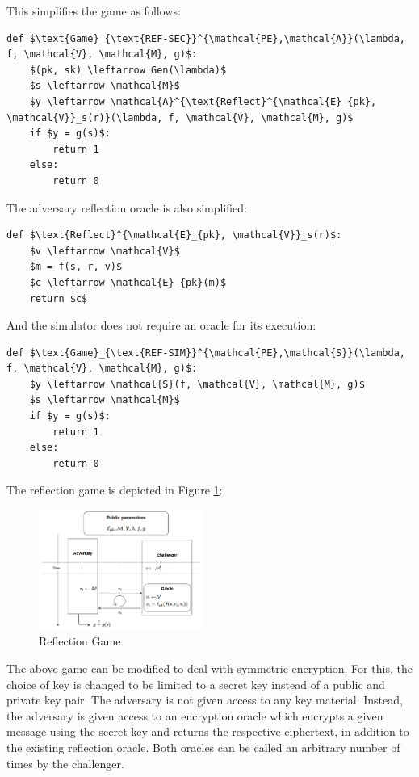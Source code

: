 \documentclass[conference, letterpaper, 10pt]{IEEEtran}
\begin{document}
This simplifies the game as follows:

\begin{lstlisting}[texcl,mathescape,basicstyle=\small]
def $\text{Game}_{\text{REF-SEC}}^{\mathcal{PE},\mathcal{A}}(\lambda, f, \mathcal{V}, \mathcal{M}, g)$:
    $(pk, sk) \leftarrow Gen(\lambda)$
    $s \leftarrow \mathcal{M}$
    $y \leftarrow \mathcal{A}^{\text{Reflect}^{\mathcal{E}_{pk}, \mathcal{V}}_s(r)}(\lambda, f, \mathcal{V}, \mathcal{M}, g)$
    if $y = g(s)$:
        return 1
    else:
        return 0
\end{lstlisting}

The adversary reflection oracle is also simplified:

\begin{lstlisting}[texcl,mathescape,basicstyle=\small]
def $\text{Reflect}^{\mathcal{E}_{pk}, \mathcal{V}}_s(r)$:
    $v \leftarrow \mathcal{V}$
    $m = f(s, r, v)$
    $c \leftarrow \mathcal{E}_{pk}(m)$
    return $c$
\end{lstlisting}

And the simulator does not require an oracle for its execution:

\begin{lstlisting}[texcl,mathescape,basicstyle=\small]
def $\text{Game}_{\text{REF-SIM}}^{\mathcal{PE},\mathcal{S}}(\lambda, f, \mathcal{V}, \mathcal{M}, g)$:
    $y \leftarrow \mathcal{S}(f, \mathcal{V}, \mathcal{M}, g)$
    $s \leftarrow \mathcal{M}$
    if $y = g(s)$:
        return 1
    else:
        return 0
\end{lstlisting}

The reflection game is depicted in Figure \ref{fig:refgame}:

    \begin{figure}[thpb]
        \centering
            \includegraphics[width=0.48\textwidth]{reflection_game.png}
        \caption{Reflection Game}
        \label{fig:refgame}
    \end{figure}

 The above game can be modified to deal
with symmetric encryption. For this, the choice of key is changed to be limited
to a secret key instead of a public and private key pair. The adversary is not
given access to any key material.  Instead, the adversary is given access to an
encryption oracle which encrypts a given message using the secret key and
returns the respective ciphertext, in addition to the existing reflection
oracle. Both oracles can be called an arbitrary number of times by the
challenger.
\end{document}

